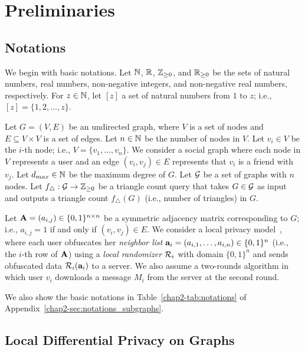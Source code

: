 \section{Preliminaries}
\label{chap2-sec:preliminaries}

\subsection{Notations}
\label{chap2-sub:notations}
We begin with basic notations. 
Let $\mathbb{N}$, $\mathbb{R}$, $\mathbb{Z}_{\ge0}$, and $\mathbb{R}_{\ge0}$ be the sets of natural numbers, real numbers, non-negative integers, and non-negative real numbers, respectively. 
For $z\in\mathbb{N}$, let $[z]$ a set of natural numbers from $1$ to $z$; i.e., $[z] = \{1, 2, \ldots, z\}$. 

Let $G=(V,E)$ be an undirected graph, where $V$ is a set of nodes and $E \subseteq V \times V$ is a set of edges. 
Let $n\in\mathbb{N}$ be the number of nodes in $V$. 
Let $v_i \in V$ be the $i$-th node; i.e., $V=\{v_1,\ldots,v_n\}$. 
We consider a social graph where each node in $V$ represents a user and an edge $(v_i,v_j) \in E$ represents that $v_i$ is a friend with $v_j$. 
Let $d_{max} \in \mathbb{N}$ be the maximum degree of $G$. 
Let $\mathcal{G}$ be a set of graphs with $n$ nodes. 
Let $f_\triangle: \mathcal{G} \rightarrow \mathbb{Z}_{\ge0}$ be a triangle 
count query 
that takes $G \in \mathcal{G}$ as input and outputs 
a triangle count $f_\triangle(G)$ (i.e., number of triangles) in $G$. 



Let $\mathbf{A}=(a_{i,j}) \in \{0,1\}^{n \times n}$ be a symmetric adjacency matrix corresponding to $G$; i.e., $a_{i,j} = 1$ if and only if $(v_i,v_j) \in E$. 
We consider a local privacy model~\cite{Qin_CCS17,Imola_USENIX21}, where each user obfuscates her \textit{neighbor list} $\mathbf{a}_i = (a_{i,1}, \ldots, a_{i,n})\in\{0,1\}^n$ (i.e., the $i$-th row of $\mathbf{A}$) using 
a \textit{local randomizer} 
$\mathcal{R}_i$ with domain $\{0,1\}^n$ and sends obfuscated data $\mathcal{R}_i(\mathbf{a}_i)$ to a server. 
We also assume a two-rounds algorithm in which user $v_i$ downloads a message $M_i$ from the server at the second round. 

We also show the basic notations in Table~\ref{chap2-tab:notations} of Appendix~\ref{chap2-sec:notations_subgraphs}.

\subsection{Local Differential Privacy on Graphs}
\label{chap2-sub:LDP}

